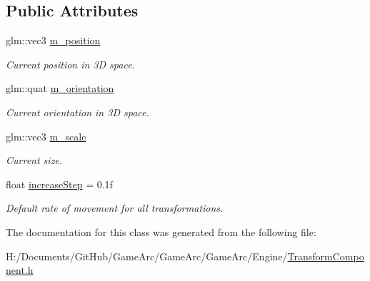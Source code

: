 \subsection*{Public Attributes}
\begin{DoxyCompactItemize}
\item 
\hypertarget{class_transform_component_a5a441b52ff5f18d940e3351e35868481}{glm\+::vec3 \hyperlink{class_transform_component_a5a441b52ff5f18d940e3351e35868481}{m\+\_\+position}}\label{class_transform_component_a5a441b52ff5f18d940e3351e35868481}

\begin{DoxyCompactList}\small\item\em Current position in 3\+D space. \end{DoxyCompactList}\item 
\hypertarget{class_transform_component_a70f27f66f621e0e52e96e40ec168ede2}{glm\+::quat \hyperlink{class_transform_component_a70f27f66f621e0e52e96e40ec168ede2}{m\+\_\+orientation}}\label{class_transform_component_a70f27f66f621e0e52e96e40ec168ede2}

\begin{DoxyCompactList}\small\item\em Current orientation in 3\+D space. \end{DoxyCompactList}\item 
\hypertarget{class_transform_component_a50d168d6290b29a66b21ce576fa44d59}{glm\+::vec3 \hyperlink{class_transform_component_a50d168d6290b29a66b21ce576fa44d59}{m\+\_\+scale}}\label{class_transform_component_a50d168d6290b29a66b21ce576fa44d59}

\begin{DoxyCompactList}\small\item\em Current size. \end{DoxyCompactList}\item 
\hypertarget{class_transform_component_a86cf1deb8c126b29155bc415bfa4d75f}{float \hyperlink{class_transform_component_a86cf1deb8c126b29155bc415bfa4d75f}{increase\+Step} = 0.\+1f}\label{class_transform_component_a86cf1deb8c126b29155bc415bfa4d75f}

\begin{DoxyCompactList}\small\item\em Default rate of movement for all transformations. \end{DoxyCompactList}\end{DoxyCompactItemize}


The documentation for this class was generated from the following file\+:\begin{DoxyCompactItemize}
\item 
H\+:/\+Documents/\+Git\+Hub/\+Game\+Arc/\+Game\+Arc/\+Game\+Arc/\+Engine/\hyperlink{_transform_component_8h}{Transform\+Component.\+h}\end{DoxyCompactItemize}
